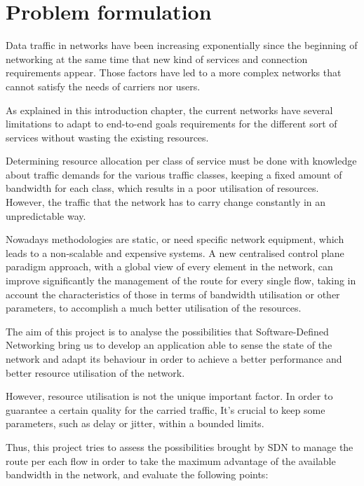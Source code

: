 \section{Problem formulation}
\label{sec:problemformulation}

Data traffic in networks have been increasing exponentially since the beginning of networking at the same time that new kind of services and connection requirements appear. Those factors have led to a more complex networks that cannot satisfy the needs of carriers nor users.

As explained in this introduction chapter, the current networks have several limitations to adapt to end-to-end goals requirements for the different sort of services without wasting the existing resources. 

Determining resource allocation per class of service must be done with knowledge about traffic demands for the various traffic classes, keeping a fixed amount of bandwidth for each class, which results in a poor utilisation of resources. However, the traffic that the network has to carry change constantly in an unpredictable way.

Nowadays methodologies are static, or need specific network equipment, which leads to a non-scalable and expensive systems. A new centralised control plane paradigm approach, with a global view of every element in the network, can improve significantly the management of the route for every single flow, taking in account the characteristics of those in terms of bandwidth utilisation or other parameters, to accomplish a much better utilisation  of the resources.

The aim of this project is to analyse the possibilities that Software-Defined Networking bring us to develop an application able to sense the state of the network and adapt its behaviour in order to achieve a better performance and better resource utilisation of the network.

However, resource utilisation is not the unique important factor. In order to guarantee a certain quality for the carried traffic, It's crucial to keep some parameters, such as delay or jitter, within a bounded limits.  


Thus, this project tries to assess the possibilities brought by SDN to manage the route per each flow in order to take the maximum advantage of the available bandwidth in the network, and evaluate the following points:

